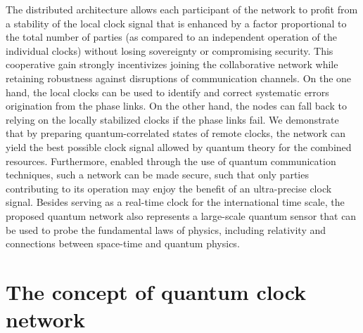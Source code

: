 The distributed architecture allows each participant of the network to profit
from a stability of the local clock signal that is enhanced by a factor
proportional to the total number of parties (as compared to an independent
operation of the individual clocks) without losing sovereignty or compromising
security. This cooperative gain strongly incentivizes joining the collaborative
network while retaining robustness against
 disruptions of communication channels.
On the one hand,
the local clocks can be used to identify and correct systematic errors
origination from the phase links. On the other hand, the nodes can fall
back to relying on the locally stabilized clocks if the phase links fail.
We demonstrate that by preparing quantum-correlated states of
remote clocks, the network can yield the best possible clock signal allowed by
quantum theory for the combined resources.
Furthermore, enabled through the use of quantum communication techniques,  such
a network can be made secure, such that only parties contributing to its
operation may enjoy the benefit of an ultra-precise clock signal. Besides
serving as a real-time clock for the international time scale,  the proposed
quantum network also represents a large-scale quantum sensor that can be used to
probe the fundamental laws of physics, including relativity and connections between space-time and quantum physics.

  










\section{The concept of quantum clock network}
\label{sec:QCN}

